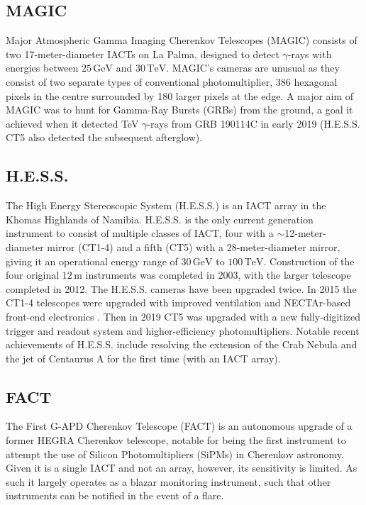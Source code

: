 \subsection{MAGIC}
Major Atmospheric Gamma Imaging Cherenkov Telescopes (MAGIC) consists of two 17-meter-diameter IACTs on La Palma, designed to detect $\gamma$-rays with energies between $\mathrm{25\,GeV}$ and $\mathrm{30\,TeV}$. MAGIC's cameras are unusual as they consist of two separate types of conventional photomultiplier, 386 hexagonal pixels in the centre surrounded by 180 larger pixels at the edge. A major aim of MAGIC was to hunt for Gamma-Ray Bursts (GRBs) from the ground, a goal it achieved when it detected TeV $\gamma$-rays from GRB 190114C in early 2019 \cite{magicGRB} (H.E.S.S. CT5 also detected the subsequent afterglow).

\subsection{H.E.S.S.}
The High Energy Stereoscopic System (H.E.S.S.) is an IACT array in the Khomas Highlands of Namibia. H.E.S.S. is the only current generation instrument to consist of multiple classes of IACT, four with a $\sim$12-meter-diameter mirror (CT1-4) and a fifth (CT5) with a 28-meter-diameter mirror, giving it an operational energy range of $\mathrm{30\,GeV}$ to $\mathrm{100\,TeV}$. Construction of the four original $\mathrm{12\,m}$ instruments was completed in 2003, with the larger telescope completed in 2012. The H.E.S.S. cameras have been upgraded twice. In 2015 the CT1-4 telescopes were upgraded with improved ventilation and NECTAr-based front-end electronics \cite{hess1u}. Then in 2019 CT5 was upgraded with a new fully-digitized trigger and readout system and higher-efficiency photomultipliers. Notable recent achievements of H.E.S.S. include resolving the extension of the Crab Nebula \cite{crabextension} and the jet of Centaurus A \cite{cena} for the first time (with an IACT array).

\subsection{FACT}
The First G-APD Cherenkov Telescope (FACT) is an autonomous upgrade of a former HEGRA Cherenkov telescope, notable for being the first instrument to attempt the use of Silicon Photomultipliers (SiPMs) in Cherenkov astronomy. Given it is a single IACT and not an array, however, its sensitivity is limited. As such it largely operates as a blazar monitoring instrument, such that other instruments can be notified in the event of a flare. 

